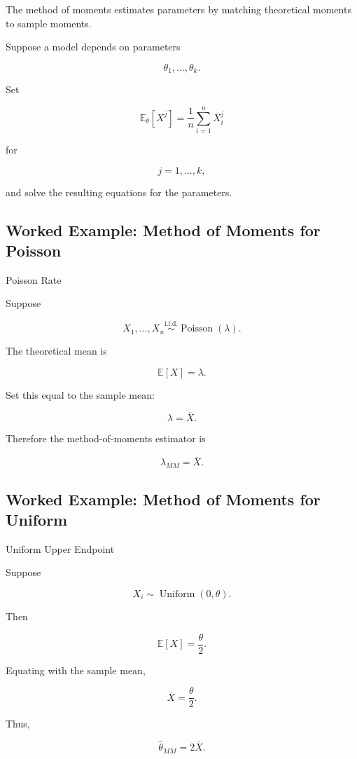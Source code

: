 The method of moments estimates parameters by matching theoretical
moments to sample moments.

Suppose a model depends on parameters

\[
\theta_1,\ldots,\theta_k.
\]

Set

\[
\boxed{
\mathbb{E}_\theta[X^j]
=
\frac1n
\sum_{i=1}^{n}X_i^j
}
\]

for

\[
j=1,\ldots,k,
\]

and solve the resulting equations for the parameters.

\subsection{Worked Example: Method of Moments for Poisson}
\label{subsec:worked-mom-poisson}

\begin{workedexamplebox}{Poisson Rate}

Suppose

\[
X_1,\ldots,X_n
\overset{\text{i.i.d.}}{\sim}
\operatorname{Poisson}(\lambda).
\]

The theoretical mean is

\[
\mathbb{E}[X]=\lambda.
\]

Set this equal to the sample mean:

\[
\lambda
=
\overline{X}.
\]

Therefore the method-of-moments estimator is

\begin{answerbox}
\[
\boxed{
\widehat{\lambda}_{MM}
=
\overline{X}.
}
\]
\end{answerbox}

\end{workedexamplebox}

\subsection{Worked Example: Method of Moments for Uniform}
\label{subsec:worked-mom-uniform}

\begin{workedexamplebox}{Uniform Upper Endpoint}

Suppose

\[
X_i
\sim
\operatorname{Uniform}(0,\theta).
\]

Then

\[
\mathbb{E}[X]
=
\frac{\theta}{2}.
\]

Equating with the sample mean,

\[
\overline{X}
=
\frac{\theta}{2}.
\]

Thus,

\begin{answerbox}
\[
\boxed{
\widehat{\theta}_{MM}
=
2\overline{X}.
}
\]
\end{answerbox}

\end{workedexamplebox}

